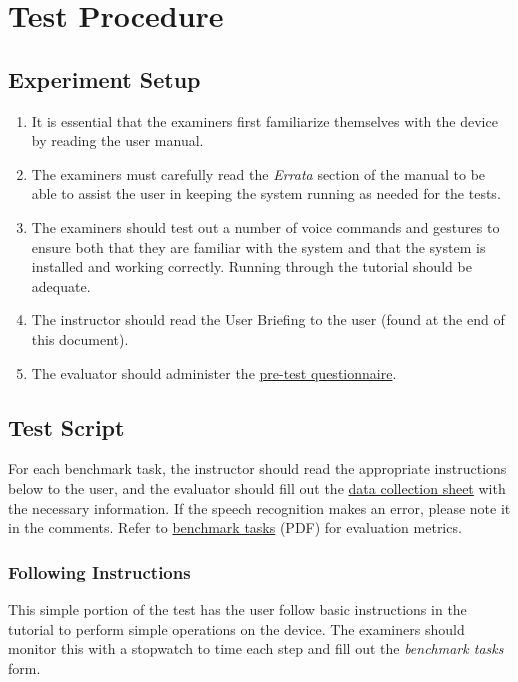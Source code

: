 \documentclass[12pt,letterpaper]{article}
\begin{document}
\section{Test Procedure}

\subsection{Experiment Setup}

\begin{enumerate}
\item It is essential that the examiners first familiarize themselves with the device by reading the user manual.
\item The examiners must carefully read the \textit{Errata} section of the manual to be able to assist the user in keeping the system running as needed for the tests.
\item The examiners should test out a number of voice commands and gestures to ensure both that they are familiar with the system and that the system is installed and working correctly. Running through the tutorial should be adequate.
\item The instructor should read the User Briefing to the user (found at the end of this document).
\item The evaluator should administer the \href{http://fluidsurveys.com/s/hciplayer-pretest/}{pre-test questionnaire}.
\end{enumerate}

\subsection{Test Script}

For each benchmark task, the instructor should read the appropriate instructions below to the user, and the evaluator should fill out the \href{http://fluidsurveys.com/s/hciplayer-datacollectionsheet/}{data collection sheet} with the necessary information. If the speech recognition makes an error, please note it in the comments. Refer to \href{http://www.ece.mcgill.ca/~scormi3/hci/docs/benchmark-tasks.pdf}{benchmark tasks} (PDF) for evaluation metrics.

\subsubsection{Following Instructions}
This simple portion of the test has the user follow basic instructions in the tutorial to perform simple operations on the device. The examiners should monitor this with a stopwatch to time each step and fill out the \emph{benchmark tasks} form. 
\end{document}
